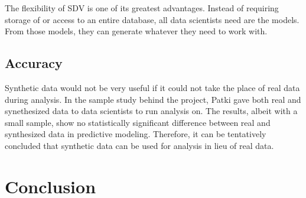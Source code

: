 
The flexibility of SDV is one of its greatest advantages. Instead of requiring
storage of or access to an entire database, all data scientists need are the
models. From those models, they can generate whatever they need to work with.

\subsection{Accuracy}

Synthetic data would not be very useful if it could not take the place of real
data during analysis. In the sample study behind the project, Patki gave both
real and synethesized data to data scientists to run analysis on. The results,
albeit with a small sample, show no statistically significant difference
between real and synthesized data in predictive modeling. Therefore, it can
be tentatively concluded that synthetic data can be used for analysis in
lieu of real data. \cite{}


\section{Conclusion}





